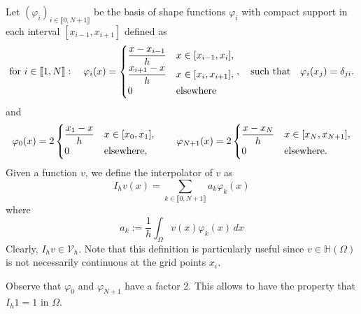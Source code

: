 \documentclass[11 pt]{article}
\newcommand\inter[1]{\llbracket #1\rrbracket}
\numberwithin{equation}{section}
\begin{document}
Let $(\varphi_i)_{i\in\inter{0,N+1}}$ be the basis of shape functions $\varphi_i$ with compact support in each interval $[x_{i-1},x_{i+1}]$ defined as
%
\begin{align}\label{eq:def_basis}
    \textnormal{for $i\in\inter{1,N}$}:\quad \varphi_i(x)=\begin{cases}
        \displaystyle \frac{x-x_{i-1}}{h} &x\in[x_{i-1},x_i], \\
        \displaystyle \frac{x_{i+1}-x}{h} &x\in [x_i,x_{i+1}], \\
        0 &\textnormal{elsewhere}
    \end{cases}, \quad\textnormal{such that}\quad \varphi_i(x_j)=\delta_{ji}.
\end{align}
and
%
\begin{align}\label{eq:def_basis_ext}
    \varphi_0(x)=2\begin{cases}
        \displaystyle \frac{x_{1}-x}{h} &x\in [x_0,x_{1}], \\
        0 &\textnormal{elsewhere},
    \end{cases} \qquad \varphi_{N+1}(x)=2\begin{cases}
        \displaystyle \frac{x-x_{N}}{h} &x\in[x_{N},x_{N+1}], \\
        0 &\textnormal{elsewhere.}
    \end{cases}
\end{align}
%
Given a function $v$, we define the interpolator of $v$ as
%
\begin{equation}\label{eq:interpolator}
I_h v(x)=\sum_{k\in\inter{0,N+1}}a_k \varphi_k(x)
\end{equation}
where
%
\begin{equation}\label{eq:def_coeff_ak}
  a_k:=\frac{1}{h}\int_{\Omega}v(x)\varphi_k(x)\,dx  
\end{equation}
%
Clearly, $I_h v\in\mathcal V_h$. Note that this definition is particularly useful since $v\in\mathbb H(\Omega)$ is not necessarily continuous at the grid points $x_i$. 

Observe that $\varphi_0$ and $\varphi_{N+1}$ have a factor 2.  This allows to have the property that $I_h 1 = 1$ in $\Omega$.
\end{document}
